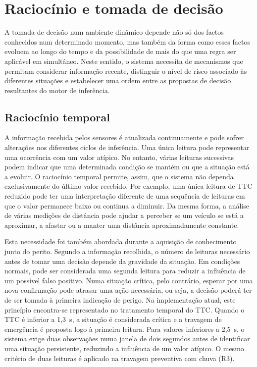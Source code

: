 \chapter{Raciocínio e tomada de decisão}
\label{cap:decisao}

A tomada de decisão num ambiente dinâmico depende não só dos factos conhecidos
num determinado momento, mas também da forma como esses factos evoluem ao
longo do tempo e da possibilidade de mais do que uma regra ser aplicável em
simultâneo. Neste sentido, o sistema necessita de mecanismos que permitam
considerar informação recente, distinguir o nível de risco associado às
diferentes situações e estabelecer uma ordem entre as propostas de decisão
resultantes do motor de inferência.

\section{Raciocínio temporal}
\label{sec:raciocinio-temporal}

A informação recebida pelos sensores é atualizada continuamente e pode sofrer
alterações nos diferentes ciclos de inferência. Uma única leitura pode
representar uma ocorrência com um valor atípico. No entanto, várias leituras
sucessivas podem indicar que uma determinada condição se mantém ou que a
situação está a evoluir. O raciocínio temporal permite, assim, que o sistema
não dependa exclusivamente do último valor recebido. Por exemplo, uma única
leitura de TTC reduzido pode ter uma interpretação diferente de uma sequência
de leituras em que o valor permanece baixo ou continua a diminuir. Da mesma
forma, a análise de várias medições de distância pode ajudar a perceber se um
veículo se está a aproximar, a afastar ou a manter uma distância
aproximadamente constante.

Esta necessidade foi também abordada durante a aquisição de conhecimento
junto do perito. Segundo a informação recolhida, o número de leituras
necessário antes de tomar uma decisão depende da gravidade da situação. Em
condições normais, pode ser considerada uma segunda leitura para reduzir a
influência de um possível falso positivo. Numa situação crítica, pelo
contrário, esperar por uma nova confirmação pode atrasar uma ação necessária,
ou seja, a decisão poderá ter de ser tomada à primeira indicação de perigo. Na
implementação atual, este princípio encontra-se representado no tratamento
temporal do TTC. Quando o TTC é inferior a 1,3~s, a situação é considerada
crítica e a travagem de emergência é proposta logo à primeira leitura. Para
valores inferiores a 2,5~s, o sistema exige duas observações numa janela de
dois segundos antes de identificar uma situação persistente, reduzindo a
influência de um valor atípico. O mesmo critério de duas leituras é aplicado
na travagem preventiva com chuva (R3).

